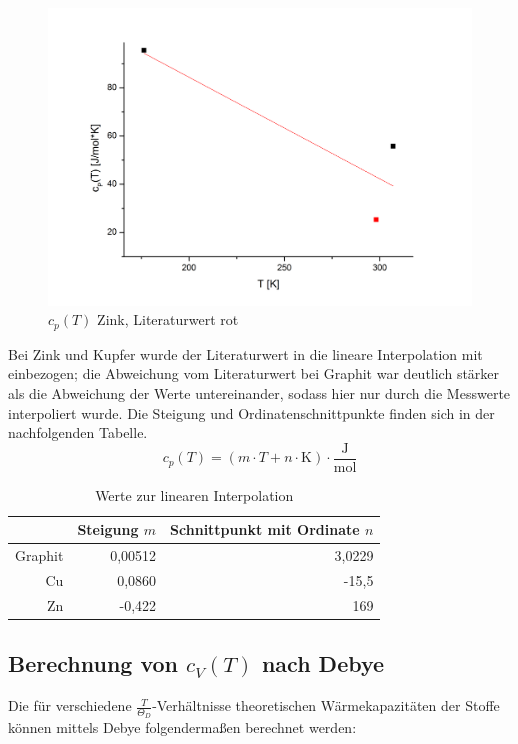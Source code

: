 \documentclass[12pt,a4paper,titlepage,headinclude,bibtotoc]{scrartcl}
\begin{document}
\begin{figure} [h!]
\begin{center}
\includegraphics[scale=0.5]{Zinkcp(T)Neu.png} \end{center}
\caption{$c_p(T)$ Zink, Literaturwert rot}
\end{figure}    
\FloatBarrier 

      
Bei Zink und Kupfer wurde der Literaturwert in die lineare Interpolation mit einbezogen; die Abweichung vom Literaturwert bei Graphit war deutlich stärker als die Abweichung der Werte untereinander, sodass hier nur durch die Messwerte interpoliert wurde. Die Steigung und Ordinatenschnittpunkte finden sich in der nachfolgenden Tabelle.\\

\begin{equation}
c_p(T) = \left( m\cdot T  + n \cdot \mathrm{K} \right) \cdot \frac{\mathrm{J}}{\mathrm{mol}}
\end{equation}


\begin{table} [h] 
\caption{Werte zur linearen Interpolation}
\begin{tabular} {r | r|  r }
& Steigung $m$& Schnittpunkt mit Ordinate $n$\\
\hline
Graphit& 0,00512&3,0229\\
Cu&	0,0860	&-15,5\\
Zn&	-0,422	&169\\
\end{tabular}
\end{table}


\subsection{Berechnung von $c_{V}(T)$ nach Debye}
Die für verschiedene $\frac{T}{\Theta_{D}}$-Verhältnisse theoretischen Wärmekapazitäten der Stoffe können mittels Debye folgendermaßen berechnet werden:\\
\end{document}
